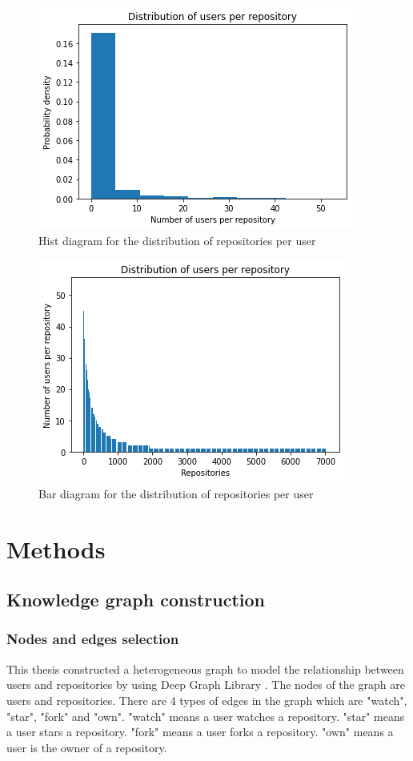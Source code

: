 \documentclass[11pt,twoside]{report}
\begin{document}
\begin{figure}[H]
    \centering
    \includegraphics[scale=0.9]{user_repo_dist_hist.png}
    \caption{Hist diagram for the distribution of repositories per user}
    \label{fig:user_repo_dist_hist}
\end{figure}

\begin{figure}[H]
    \centering
    \includegraphics[scale=0.9]{user_repo_dist_bar.png}
    \caption{Bar diagram for the distribution of repositories per user}
    \label{fig:user_repo_dist_bar}
\end{figure}

\chapter{Methods}
\section{Knowledge graph construction}
\subsection{Nodes and edges selection}
This thesis constructed a heterogeneous graph to model the relationship between users and repositories by using Deep Graph Library \cite{wang2019dgl}. The nodes of the graph are users and repositories. There are 4 types of edges in the graph which are "watch", "star", "fork" and "own". "watch" means a user watches a repository. "star" means a user stars a repository. "fork" means a user forks a repository. "own" means a user is the owner of a repository. 
\end{document}
